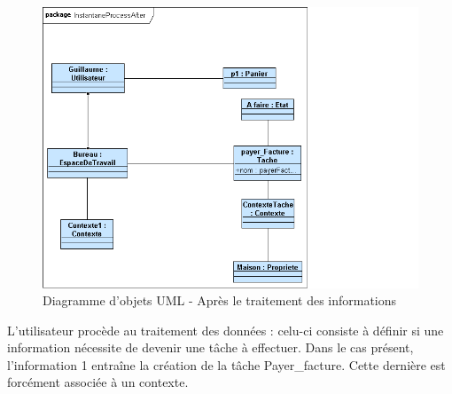 	\begin{figure}[H]
	\begin{center}
	\includegraphics[scale=0.5]{diagrams/diag_objets_process_after.png}
	\caption{Diagramme d'objets UML  - Après le traitement des informations}
	\end{center}
	\end{figure}
	
	\bigskip 
	
	
	L'utilisateur procède au traitement des données : celu-ci consiste à définir si une information nécessite de devenir une tâche à effectuer. Dans le cas présent, l'information 1 entraîne la création de la tâche Payer\_facture. Cette dernière est forcément associée à un contexte.  
